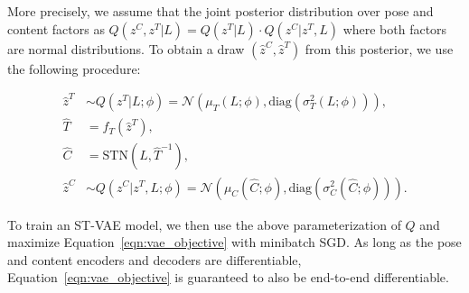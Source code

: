More precisely, we assume that the joint posterior distribution over
pose and content factors as
$Q(z^C, z^T | L) = Q(z^T |L)\cdot Q(z^C | z^T, L)$ where both factors are normal distributions.  
To obtain a draw $(\hat{z}^C, \hat{z}^T)$ from this posterior, we use the following procedure:\vspace{-2mm}

\begin{align*}
\hat{z}^T &\sim Q(z^T |L; \phi) = \mathcal{N}(\mu_{T}(L; \phi), \mbox{diag}(\sigma_{T}^2(L; \phi))), \\
\hat{T} &= f_T(\hat{z}^T), \\
\hat{C} &= \mbox{STN}(L, \hat{T}^{-1}), \\
\hat{z}^C &\sim Q(z^C | z^T, L; \phi) =  \mathcal{N}(\mu_{C}(\hat{C}; \phi), \mbox{diag}(\sigma_{C}^2(\hat{C}; \phi))).
\end{align*}


To train an ST-VAE model, we then use the above parameterization of $Q$ and maximize Equation~\ref{eqn:vae_objective} with minibatch
SGD.
As long as the pose and content encoders and decoders  are differentiable, Equation~\ref{eqn:vae_objective} is guaranteed to also be 
end-to-end differentiable.






